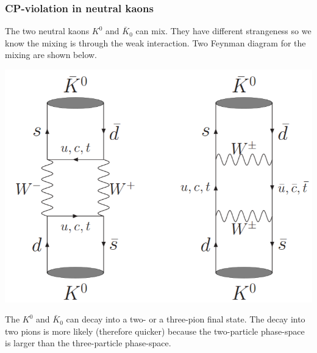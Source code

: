 \documentclass[12pt]{article}
\begin{document}
\subsubsection{CP-violation in neutral kaons}
%
%
The two neutral kaons $K^0$ and $\bar K_0$ can mix. They have different strangeness so we know the mixing is through the weak interaction. Two Feynman diagram for the mixing are shown below.
\begin{center}
\includegraphics[scale=0.3]{images/KaonMixing.png}
\end{center}
The $K^0$ and $\bar K_0$ can decay into a two- or a three-pion final state. The decay into two pions is more likely (therefore quicker) because the two-particle phase-space is larger than the three-particle phase-space.
\end{document}
